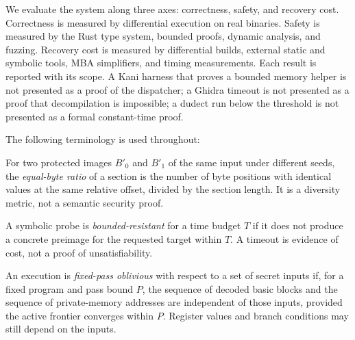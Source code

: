 We evaluate the system along three axes: correctness, safety, and recovery cost.
Correctness is measured by differential execution on real binaries. Safety is
measured by the Rust type system, bounded proofs, dynamic analysis, and fuzzing.
Recovery cost is measured by differential builds, external static and symbolic
tools, MBA simplifiers, and timing measurements. Each result is reported with
its scope. A Kani harness that proves a bounded memory helper is not presented as
a proof of the dispatcher; a Ghidra timeout is not presented as a proof that
decompilation is impossible; a dudect run below the threshold is not presented as
a formal constant-time proof.

The following terminology is used throughout:

\begin{definition}
For two protected images $B'_0$ and $B'_1$ of the same input under different
seeds, the \emph{equal-byte ratio} of a section is the number of byte positions
with identical values at the same relative offset, divided by the section length.
It is a diversity metric, not a semantic security proof.
\end{definition}

\begin{definition}
A symbolic probe is \emph{bounded-resistant} for a time budget $T$ if it does not
produce a concrete preimage for the requested target within $T$. A timeout is
evidence of cost, not a proof of unsatisfiability.
\end{definition}

\begin{definition}
An execution is \emph{fixed-pass oblivious} with respect to a set of secret
inputs if, for a fixed program and pass bound $P$, the sequence of decoded basic
blocks and the sequence of private-memory addresses are independent of those
inputs, provided the active frontier converges within $P$. Register values and
branch conditions may still depend on the inputs.
\end{definition}
